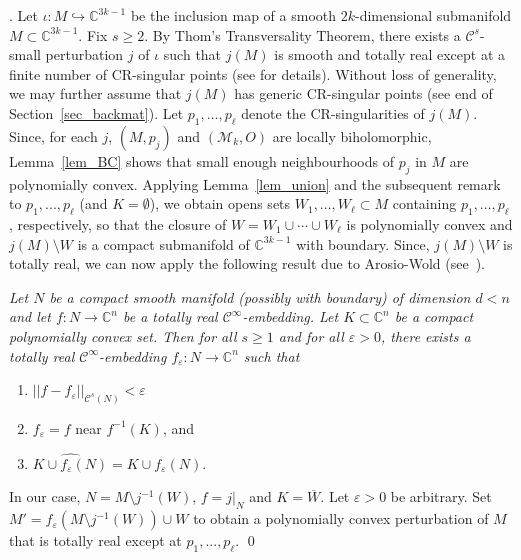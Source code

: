 \documentclass[10pt]{amsart}
\numberwithin{equation}{section}
\theoremstyle{definition}
\theoremstyle{definition}
\theoremstyle{plain}
\newcommand{\bc}{\mathcal{M}}
\newcommand{\eps}{\varepsilon}
\newcommand{\cont}{\mathcal{C}}
\newcommand{\Cn}{\mathbb{C}^n}
\newcommand{\C} {\mathbb{C}}
\begin{document}
.
Let $\iota:M\hookrightarrow\C^{3k-1}$ be the inclusion map of a smooth $2k$-dimensional submanifold $M\subset\C^{3k-1}$. Fix $s\geq 2$. By Thom's Transversality Theorem, there exists a $\cont^s$-small perturbation $j$ of $\iota$ such that $j(M)$ is smooth and totally real except at a finite number of CR-singular points (see \cite[Section~1]{Do95} for details). Without loss of generality, we may further assume that $j(M)$ has generic CR-singular points (see end of Section~\ref{sec_backmat}). Let $p_1,...,p_\ell$ denote the CR-singularities of $j(M)$. Since, for each $j$, $(M,p_j)$ and $(\bc_k,O)$ are locally biholomorphic, Lemma~\ref{lem_BC} shows that small enough neighbourhoods of $p_j$ in $M$ are polynomially convex.  Applying Lemma~\ref{lem_union} and the subsequent remark to $p_1,...,p_\ell$ (and $K=\emptyset$), we obtain opens sets $W_1,...,W_\ell\subset M$ containing $p_1,...,p_\ell$, respectively, so that the closure of $W=W_1\cup\cdots\cup W_\ell$ is polynomially convex and $j(M)\setminus W$ is a compact submanifold of $\C^{3k-1}$ with boundary. Since, $j(M)\setminus W$ is totally real, we can now apply the following result due to Arosio-Wold (see~\cite[Theorem~1.4]{ArWo17}). {\em Let $N$ be a compact smooth manifold (possibly with boundary) of dimension $d<n$ and let $f:N\rightarrow\Cn$ be a totally real $\cont^\infty$-embedding. Let $K\subset\Cn$ be a compact polynomially convex set. Then for all $s\geq 1$ and for all $\eps>0$, there exists a totally real $\cont^\infty$-embedding $f_\eps:N\rightarrow\Cn$ such that
	\begin{enumerate}
		\item $||f-f_\eps||_{\cont^s(N)}<\eps$ 
		\item $f_\eps=f$ near $f^{-1}(K)$, and
		\item $\widehat{K\cup f_\eps(N)}=K\cup f_\eps (N)$. 
	 \end{enumerate}} 
In our case, $N=M\setminus j^{-1}(W)$, $f=j|_N$ and $K=\overline W$. Let $\eps>0$ be arbitrary. Set $M'=f_\eps(M\setminus j^{-1}(W))\cup W$ to obtain a polynomially convex perturbation of $M$ that is totally real except at $p_1,...,p_\ell$.
\qed

\medskip
\end{document}

